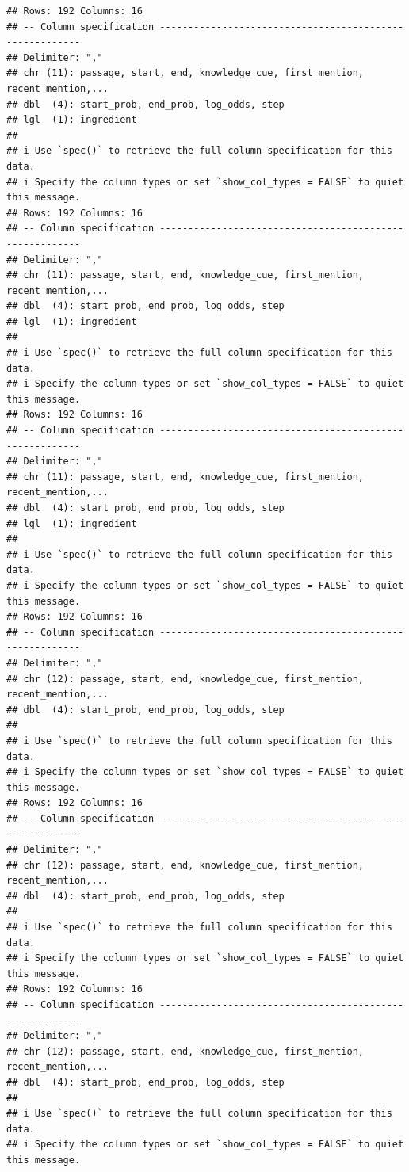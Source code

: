 \documentclass[
]{article}
\begin{document}
\begin{verbatim}
## Rows: 192 Columns: 16
## -- Column specification --------------------------------------------------------
## Delimiter: ","
## chr (11): passage, start, end, knowledge_cue, first_mention, recent_mention,...
## dbl  (4): start_prob, end_prob, log_odds, step
## lgl  (1): ingredient
## 
## i Use `spec()` to retrieve the full column specification for this data.
## i Specify the column types or set `show_col_types = FALSE` to quiet this message.
## Rows: 192 Columns: 16
## -- Column specification --------------------------------------------------------
## Delimiter: ","
## chr (11): passage, start, end, knowledge_cue, first_mention, recent_mention,...
## dbl  (4): start_prob, end_prob, log_odds, step
## lgl  (1): ingredient
## 
## i Use `spec()` to retrieve the full column specification for this data.
## i Specify the column types or set `show_col_types = FALSE` to quiet this message.
## Rows: 192 Columns: 16
## -- Column specification --------------------------------------------------------
## Delimiter: ","
## chr (11): passage, start, end, knowledge_cue, first_mention, recent_mention,...
## dbl  (4): start_prob, end_prob, log_odds, step
## lgl  (1): ingredient
## 
## i Use `spec()` to retrieve the full column specification for this data.
## i Specify the column types or set `show_col_types = FALSE` to quiet this message.
## Rows: 192 Columns: 16
## -- Column specification --------------------------------------------------------
## Delimiter: ","
## chr (12): passage, start, end, knowledge_cue, first_mention, recent_mention,...
## dbl  (4): start_prob, end_prob, log_odds, step
## 
## i Use `spec()` to retrieve the full column specification for this data.
## i Specify the column types or set `show_col_types = FALSE` to quiet this message.
## Rows: 192 Columns: 16
## -- Column specification --------------------------------------------------------
## Delimiter: ","
## chr (12): passage, start, end, knowledge_cue, first_mention, recent_mention,...
## dbl  (4): start_prob, end_prob, log_odds, step
## 
## i Use `spec()` to retrieve the full column specification for this data.
## i Specify the column types or set `show_col_types = FALSE` to quiet this message.
## Rows: 192 Columns: 16
## -- Column specification --------------------------------------------------------
## Delimiter: ","
## chr (12): passage, start, end, knowledge_cue, first_mention, recent_mention,...
## dbl  (4): start_prob, end_prob, log_odds, step
## 
## i Use `spec()` to retrieve the full column specification for this data.
## i Specify the column types or set `show_col_types = FALSE` to quiet this message.

\end{verbatim}
\end{document}
